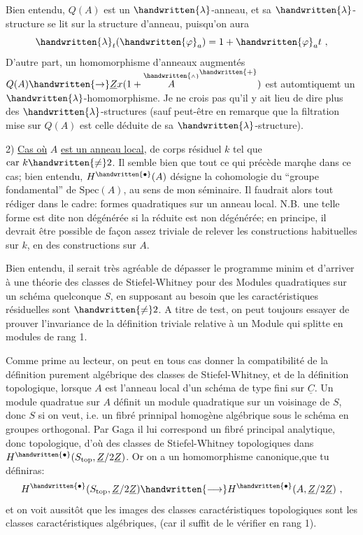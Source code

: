Bien entendu, $Q(A)$ est un $\handwritten{\lambda}$-anneau, et sa $\handwritten{\lambda}$-structure se lit sur la structure d'anneau, puisqu'on aura
\[
\handwritten{\lambda}_t(\handwritten{\varphi}_a)=1+\handwritten{\varphi}_a t\ ,
\]
D'autre part, un homomorphisme d'anneaux augmentés $Q(A)\handwritten{\to}\underline{Z}x(1+\overset{\handwritten{\scriptscriptstyle\wedge}}{A}^{\handwritten{+}})$ est automtiquemt un $\handwritten{\lambda}$-homomorphisme. Je ne crois pas qu'il y ait lieu de dire plus des $\handwritten{\lambda}$-structures (sauf peut-être en remarque que la filtration mise sur $Q(A)$ est celle déduite de sa $\handwritten{\lambda}$-structure).

2) \uline{Cas où} $A$ \uline{est un anneau local}, de corps résiduel $k$ tel que $\mathrm{car}\ k\handwritten{\ne}2$. Il semble bien que tout ce qui précède marqhe dans ce cas; bien entendu, $H^{\handwritten{\bullet}}(A)$ désigne la cohomologie du ``groupe fondamental'' de $\mathrm{Spec}(A)$, au sens de mon séminaire. Il faudrait alors tout rédiger dans le cadre: formes quadratiques sur un anneau local. N.B. une telle forme est dite non dégénérée si la réduite est non dégénérée; en principe, il  devrait être possible de façon assez triviale de relever les constructions habituelles sur $k$, en des constructions sur $A$.

Bien entendu, il serait très agréable de dépasser le programme minim et d'arriver à une théorie des classes de Stiefel-Whitney pour des Modules quadratiques sur un schéma quelconque $S$,  en supposant au besoin que les caractéristiques résiduelles sont $\handwritten{\ne}2$.  A titre de test, on peut toujours essayer de prouver l'invariance de la définition triviale relative à un Module qui splitte en modules de rang 1.

Comme prime au lecteur, on peut en tous cas donner la compatibilité de la définition purement algébrique des classes de Stiefel-Whitney, et de la définition topologique, lorsque $A$ est l'anneau local d'un schéma de type fini sur $\underline{C}$. Un module quadratue sur $A$ définit un module quadratique sur un voisinage de $S$, donc $S$ si on veut, i.e. un fibré prinnipal homogène algébrique sous le schéma en groupes orthogonal. Par Gaga il lui correspond un fibré principal analytique, donc topologique, d'où des classes de Stiefel-Whitney topologiques dans $H^{\handwritten{\bullet}}(S_{\mathrm{top}},\underline{Z}/2\underline{Z})$. Or on a un homomorphisme canonique,que tu définiras:
\[
H^{\handwritten{\bullet}}(S_{\mathrm{top}},\underline{Z}/2\underline{Z})\handwritten{\longrightarrow}H^{\handwritten{\bullet}}(A,\underline{Z}/2\underline{Z})\ ,
\]
et on voit aussitôt que les images des classes caractéristiques topologiques sont les classes caractéristiques algébriques, (car il suffit de le vérifier en rang 1).
